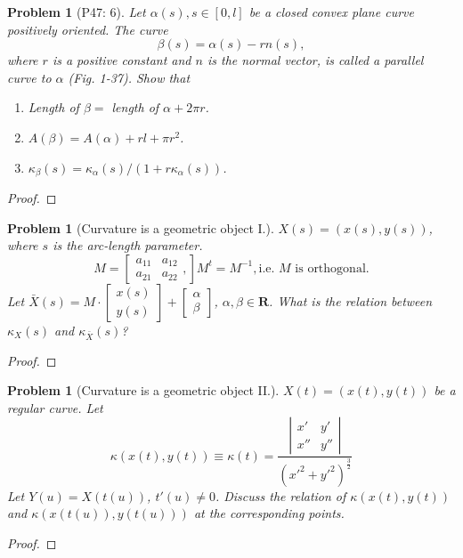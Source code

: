 \documentclass[12pt,a4paper]{article}
\newcounter{theProblemCounter}
\newtheorem{problem}[theProblemCounter]{Problem}
\begin{document}
\setcounter{theProblemCounter}{4}
\begin{problem}[P47: 6]
Let $\alpha(s), s\in [0, l]$ be a closed convex plane curve positively oriented. The curve
\[ \beta(s)=\alpha(s) - rn(s),\]
where $r$ is a positive constant and $n$ is the normal vector, is called a \emph{parallel} curve to $\alpha$ (Fig. 1-37). Show that
\begin{enumerate}
\item[(a)] Length of $\beta = $ length of $\alpha + 2\pi r$.
\item[(b)] $A(\beta)=A(\alpha)+rl+\pi r^2$.
\item[(c)] $\kappa_\beta(s) = \kappa_\alpha(s)/(1+r\kappa_\alpha(s))$.
\end{enumerate}
\end{problem}
\begin{proof}
\end{proof}
\setcounter{theProblemCounter}{7}
\begin{problem}[Curvature is a geometric object I.]
$X(s)=(x(s), y(s))$, where $s$ is the arc-length parameter.
\[ M = \left[
\begin{array}{cc} a_{11} & a_{12} \\ a_{21} & a_{22} \end{array},
\right]
M^t = M^{-1}, \mbox{i.e. $M$ is orthogonal.}
\]
Let $\bar{X}(s) = M\cdot \left[\begin{array}{c} x(s)\\y(s)\end{array}\right] + \left[\begin{array}{c}\alpha \\ \beta\end{array}\right]$,  $\alpha, \beta\in \mathbf{R}$. What is the relation between $\kappa_X(s)$ and $\kappa_{\bar{X}}(s)$?
\end{problem}
\begin{proof}
\end{proof}

\begin{problem}[Curvature is a geometric object II.]
$X(t) = (x(t), y(t))$ be a regular curve. Let
\[ \kappa(x(t), y(t)) \equiv \kappa(t) = \frac{
\left|
\begin{array}{cc} x' & y' \\ x'' & y'' \end{array}
\right|
}{(x'^2+y'^2)^\frac32} \]
Let $Y(u) = X(t(u))$, $t'(u)\ne 0$. Discuss the relation of $\kappa(x(t), y(t))$ and $\kappa(x(t(u)), y(t(u)))$ at the corresponding points.
\end{problem}
\begin{proof}
\end{proof}
\end{document}

